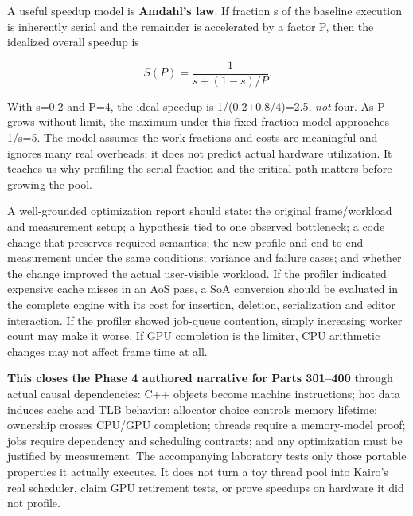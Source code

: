 A useful speedup model is \textbf{Amdahl's law}. If fraction s of the baseline execution is inherently serial and the remainder is accelerated by a factor P, then the idealized overall speedup is

\[
S(P)=\frac{1}{s+(1-s)/P}.
\]

With s=0.2 and P=4, the ideal speedup is 1/(0.2+0.8/4)=2.5, \emph{not} four. As P grows without limit, the maximum under this fixed-fraction model approaches 1/s=5. The model assumes the work fractions and costs are meaningful and ignores many real overheads; it does not predict actual hardware utilization. It teaches us why profiling the serial fraction and the critical path matters before growing the pool.

A well-grounded optimization report should state: the original frame/workload and measurement setup; a hypothesis tied to one observed bottleneck; a code change that preserves required semantics; the new profile and end-to-end measurement under the same conditions; variance and failure cases; and whether the change improved the actual user-visible workload. If the profiler indicated expensive cache misses in an AoS pass, a SoA conversion should be evaluated in the complete engine with its cost for insertion, deletion, serialization and editor interaction. If the profiler showed job-queue contention, simply increasing worker count may make it worse. If GPU completion is the limiter, CPU arithmetic changes may not affect frame time at all.

\textbf{This closes the Phase 4 authored narrative for Parts 301--400} through actual causal dependencies: C++ objects become machine instructions; hot data induces cache and TLB behavior; allocator choice controls memory lifetime; ownership crosses CPU/GPU completion; threads require a memory-model proof; jobs require dependency and scheduling contracts; and any optimization must be justified by measurement. The accompanying laboratory tests only those portable properties it actually executes. It does not turn a toy thread pool into Kairo's real scheduler, claim GPU retirement tests, or prove speedups on hardware it did not profile.

